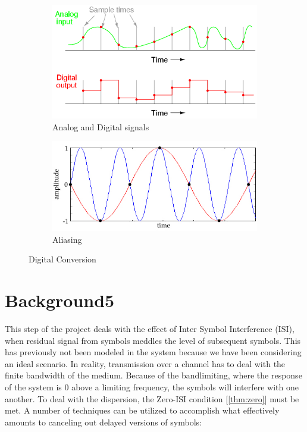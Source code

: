 \documentclass[]{article}
\begin{document}
\begin{figure}[h]
        \centering
        \begin{subfigure}[b]{0.4\textwidth}
                \includegraphics[width=\textwidth]{digitization.png}
                \caption{Analog and Digital signals}
                \label{fig:digitization}
        \end{subfigure}%
        \qquad \quad %
        \begin{subfigure}[b]{0.5\textwidth}
                \includegraphics[width=\textwidth]{aliasing.jpg}
                \caption{Aliasing \label{fig:alias}}
                \label{fig:alias}
        \end{subfigure}
        \caption{Digital Conversion \label{fig:digitize}}
\end{figure}


\newpage
\section{Background5}
\label{sec:ISIbackground}
This step of the project deals with the effect of Inter Symbol Interference (ISI), when residual signal from symbols meddles the level of subsequent symbols.  This has previously not been modeled in the system because we have been considering an ideal scenario.  In reality, transmission over a channel has to deal with the finite bandwidth of the medium.  Because of the bandlimiting, where the response of the system is 0 above a limiting frequency, the symbols will interfere with one another. To deal with the dispersion, the Zero-ISI condition [\ref{thm:zero}] must be met.  A number of techniques can be utilized to accomplish what effectively amounts to canceling out delayed versions of symbols:
\end{document}
